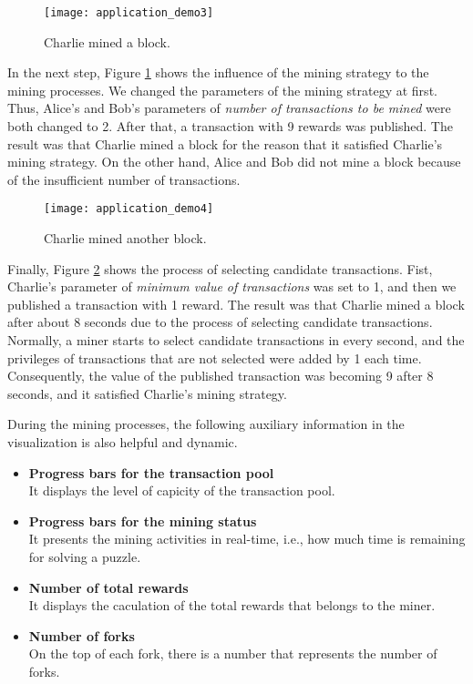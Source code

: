 \begin{figure}[htb]
    \centering
    \texttt{[image: application\_demo3]}
    \caption{Charlie mined a block.}
    \label{fig:charlie mined a block}
\end{figure}

In the next step, Figure \ref{fig:charlie mined a block} shows the influence of the mining strategy to the mining processes. We changed the parameters of the mining strategy at first. Thus, Alice's and Bob's parameters of \textit{number of transactions to be mined} were both changed to 2. After that, a transaction with 9 rewards was published. The result was that Charlie mined a block for the reason that it satisfied Charlie's mining strategy. On the other hand, Alice and Bob did not mine a block because of the insufficient number of transactions.

\begin{figure}[htb]
    \centering
    \texttt{[image: application\_demo4]}
    \caption{Charlie mined another block.}
    \label{fig:charlie mined another block}
\end{figure}

Finally, Figure \ref{fig:charlie mined another block} shows the process of selecting candidate transactions. Fist, Charlie's parameter of \textit{minimum value of transactions} was set to 1, and then we published a transaction with 1 reward. The result was that Charlie mined a block after about 8 seconds due to the process of selecting candidate transactions. Normally, a miner starts to select candidate transactions in every second, and the privileges of transactions that are not selected were added by 1 each time. Consequently, the value of the published transaction was becoming 9 after 8 seconds, and it satisfied Charlie's mining strategy.

During the mining processes, the following auxiliary information in the visualization is also helpful and dynamic.

\begin{itemize}
    \item \textbf{Progress bars for the transaction pool} \\
        It displays the level of capicity of the transaction pool.
    \item \textbf{Progress bars for the mining status} \\
        It presents the mining activities in real-time, i.e., how much time is remaining for solving a puzzle.
    \item \textbf{Number of total rewards} \\
        It displays the caculation of the total rewards that belongs to the miner.
    \item \textbf{Number of forks} \\
        On the top of each fork, there is a number that represents the number of forks.
\end{itemize}

